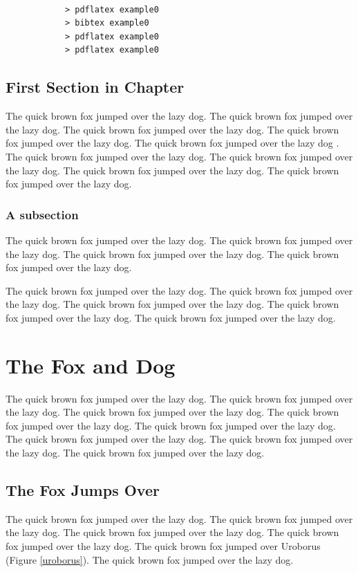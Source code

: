 \documentclass{l4proj}
\begin{document}
\begin{verbatim}

            > pdflatex example0
            > bibtex example0
            > pdflatex example0
            > pdflatex example0

\end{verbatim}


\section{First Section in Chapter}
The quick brown fox jumped over the lazy dog.
The quick brown fox jumped over the lazy dog.
The quick brown fox jumped over the lazy dog.
The quick brown fox jumped over the lazy dog.
The quick brown fox jumped over the lazy dog \cite{DIMACS}.
The quick brown fox jumped over the lazy dog.
The quick brown fox jumped over the lazy dog.
The quick brown fox jumped over the lazy dog.
The quick brown fox jumped over the lazy dog.

\subsection{A subsection}
The quick brown fox jumped over the lazy dog.
The quick brown fox jumped over the lazy dog.
The quick brown fox jumped over the lazy dog.
The quick brown fox jumped over the lazy dog.

The quick brown fox jumped over the lazy dog.
The quick brown fox jumped over the lazy dog.
The quick brown fox jumped over the lazy dog.
The quick brown fox \cite{fahle} jumped over the lazy dog.
The quick brown fox jumped over the lazy dog.

\chapter{The Fox and Dog}
The quick brown fox jumped over the lazy dog.
The quick brown fox jumped over the lazy dog.
The quick brown fox jumped over the lazy dog.
The quick brown fox jumped over the lazy dog.
The quick brown fox jumped over the lazy dog.
The quick brown fox jumped over the lazy dog.
The quick brown fox jumped over the lazy dog.
The quick brown fox jumped over the lazy dog.

\section{The Fox Jumps Over}
The quick brown fox jumped over the lazy dog.
The quick brown fox jumped over the lazy dog.
The quick brown fox jumped over the lazy dog.
The quick brown fox jumped over the lazy dog.
The quick brown fox jumped over Uroborus (Figure \ref{uroborus}).
The quick brown fox jumped over the lazy dog.
\end{document}
